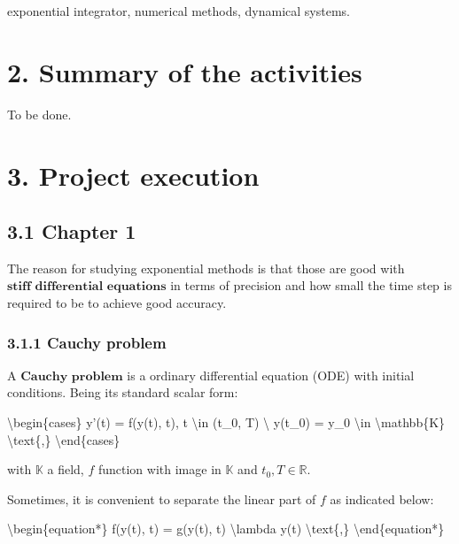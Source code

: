 \documentclass[letterpaper,10pt,english]{jupyterBook}
\begin{document}
\sphinxAtStartPar
{} exponential integrator, numerical methods, dynamical systems.

\sphinxstepscope


\chapter{2. Summary of the activities}
\label{\detokenize{Summary_of_the_activities:summary-of-the-activities}}\label{\detokenize{Summary_of_the_activities::doc}}
\sphinxAtStartPar
To be done.

\sphinxstepscope


\chapter{3. Project execution}
\label{\detokenize{Project_execution:project-execution}}\label{\detokenize{Project_execution::doc}}
\sphinxstepscope

\sphinxstepscope


\section{3.1 Chapter 1}
\label{\detokenize{cap1:chapter-1}}\label{\detokenize{cap1::doc}}
\sphinxAtStartPar
The reason for studying exponential methods is that those are good with \(\textbf{stiff differential equations}\) in terms of precision and how small the time step is required to be to achieve good accuracy.


\subsection{3.1.1 Cauchy problem}
\label{\detokenize{cap1:cauchy-problem}}
\sphinxAtStartPar
A \(\textbf{Cauchy problem}\) is a ordinary differential equation (ODE) with initial conditions. Being its standard scalar form:

\sphinxAtStartPar
\textbackslash{}begin\{cases\}
y’(t) = f(y(t), t), t \textbackslash{}in (t\_0, T) \textbackslash{}
y(t\_0) = y\_0 \textbackslash{}in \textbackslash{}mathbb\{K\} \textbackslash{}text\{,\}
\textbackslash{}end\{cases\}

\sphinxAtStartPar
with \(\mathbb{K}\) a field, \(f\) function with image in \(\mathbb{K}\) and \(t_0, T \in \mathbb{R}\).

\sphinxAtStartPar
Sometimes, it is convenient to separate the linear part of \(f\) as indicated below:

\sphinxAtStartPar
\textbackslash{}begin\{equation*\}
f(y(t), t) = g(y(t), t) \sphinxhyphen{} \textbackslash{}lambda y(t) \textbackslash{}text\{,\}
\textbackslash{}end\{equation*\}
\end{document}

